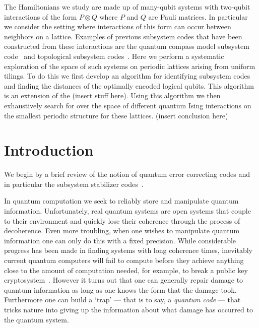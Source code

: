 \documentclass[twocolumn,showpacs,preprintnumbers,amsmath,amssymb,nofootinbib,pra,floatfix]{revtex4-1}
\begin{document}
The Hamiltonians we study are made up of many-qubit systems with two-qubit interactions of the form $P \otimes Q$ where $P$ and $Q$ are Pauli matrices.  In particular we consider the setting where interactions of this form can occur between neighbors on a lattice.  Examples of previous subsystem codes that have been constructed from these interactions are the quantum compass model subsystem code~\cite{Bacon:06a} and topological subsystem codes~\cite{Bombin:10a}.  Here we perform a systematic exploration of the space of such systems on periodic lattices arising from uniform tilings.  To do this we first develop an algorithm for identifying subsystem codes and finding the distances of the optimally encoded logical qubits.  This algorithm is an extension of the (insert stuff here).  Using this algorithm we then exhaustively search for over the space of different quantum Ising interactions on the smallest periodic structure for these lattices.   (insert conclusion here)
\tableofcontents
\section{Introduction}

We begin by a brief review of the notion of quantum error correcting codes and in particular the subsystem stabilizer codes~\cite{Poulin:05a}.

In quantum computation we seek to reliably store and manipulate quantum information.  Unfortunately, real quantum systems are open systems that couple to their environment and quickly lose their coherence through the process of decoherence.  Even more troubling, when one wishes to manipulate quantum information one can only do this with a fixed precision.  While considerable progress has been made in finding systems with long coherence times, inevitably current quantum computers will fail to compute before they achieve anything close to the amount of computation needed, for example, to break a public key cryptosystem~\cite{Shor:94a}.  However it turns out that one can generally repair damage to quantum information as long as one knows the form that the damage took.  Furthermore one can build a `trap' --- that is to say, a
\emph{quantum code} --- that tricks nature into giving up the information about what damage has occurred to the quantum system.
\end{document}
